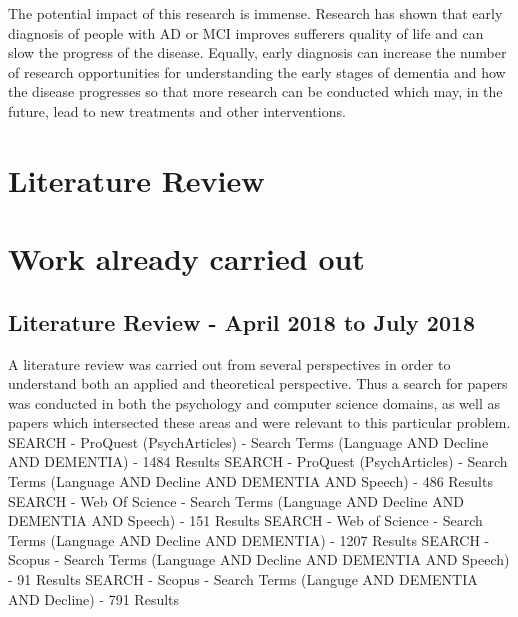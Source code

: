 \documentclass{article}
\begin{document}
	\newline
	\par
	The potential impact of this research is immense. Research has shown that early diagnosis of people with AD or MCI improves sufferers quality of life and can slow the progress of the disease. Equally, early diagnosis can increase the number of research opportunities for understanding the early stages of dementia and how the disease progresses so that more research can be conducted which may, in the future, lead to new treatments and other interventions.
	
	\section{Literature Review}
	
	\section{Work already carried out}
	
	\subsection{Literature Review - April 2018 to July 2018}
	A literature review was carried out from several perspectives in order to understand both an applied and theoretical perspective. Thus a search for papers was conducted in both the psychology and computer science domains, as well as papers which intersected these areas and were relevant to this particular problem.
	\newline
	SEARCH - ProQuest (PsychArticles) - Search Terms (Language AND Decline AND DEMENTIA) - 1484 Results
	SEARCH - ProQuest (PsychArticles) - Search Terms (Language AND Decline AND DEMENTIA AND Speech) - 486 Results
	SEARCH - Web Of Science - Search Terms (Language AND Decline AND DEMENTIA AND Speech) - 151 Results
	SEARCH - Web of Science - Search Terms (Language AND Decline AND DEMENTIA) - 1207 Results
	SEARCH - Scopus - Search Terms (Language AND Decline AND DEMENTIA AND Speech) - 91 Results 
	SEARCH - Scopus - Search Terms (Languge AND DEMENTIA AND Decline) - 791 Results
	
		
\end{document}
